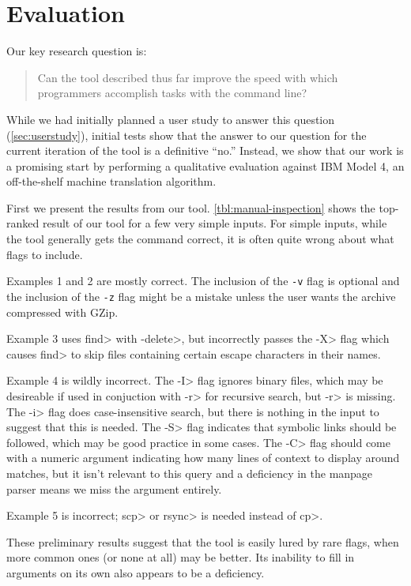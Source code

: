 \section{Evaluation}

Our key research question is:
%
\begin{quote}
    Can the tool described thus far improve the speed with which programmers
    accomplish tasks with the command line?
\end{quote}
%
While we had initially planned a user study to answer this question
(\autoref{sec:userstudy}), initial tests show that the answer to our question
for the current iteration of the tool is a definitive ``no.'' Instead, we show
that our work is a promising start by performing a qualitative evaluation
against IBM Model 4, an off-the-shelf machine translation algorithm.

First we present the results from our tool.
\autoref{tbl:manual-inspection} shows the top-ranked result of our tool for a
few very simple inputs. For simple inputs, while the tool generally gets the
command correct, it is often quite wrong about what flags to include.

Examples 1 and 2 are mostly correct. The inclusion of the \texttt{-v} flag is
optional and the inclusion of the \texttt{-z} flag might be a mistake unless the
user wants the archive compressed with GZip.

Example 3 uses \<find> with \<-delete>, but incorrectly passes the \<-X> flag
which causes \<find> to skip files containing certain escape characters in their
names.

Example 4 is wildly incorrect. The \<-I> flag ignores binary files, which may
be desireable if used in conjuction with \<-r> for recursive search, but \<-r>
is missing. The \<-i> flag does case-insensitive search, but there is nothing in
the input to suggest that this is needed. The \<-S> flag indicates that symbolic
links should be followed, which may be good practice in some cases. The \<-C>
flag should come with a numeric argument indicating how many lines of context
to display around matches, but it isn't relevant to this query and a deficiency
in the manpage parser means we miss the argument entirely.

Example 5 is incorrect; \<scp> or \<rsync> is needed instead of \<cp>.

These preliminary results suggest that the tool is easily lured by rare flags,
when more common ones (or none at all) may be better. Its inability to fill in
arguments on its own also appears to be a deficiency.

